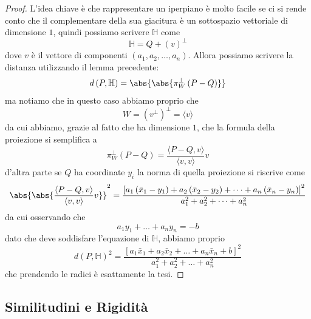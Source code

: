 \documentclass[11pt]{scrartcl}
\begin{document}
   	 \begin{proof}
   	 	L'idea chiave è che rappresentare un iperpiano è molto facile se ci si rende conto che il complementare della sua giacitura è un sottospazio vettoriale di dimensione $1$, quindi possiamo scrivere $\mathbb{H}$ come
   	 	$$\mathbb{H}=Q+\left(v\right)^\perp$$
   	 	dove $v$ è il vettore di componenti $(a_1,a_2,\dots,a_n)$. Allora possiamo scrivere la distanza utilizzando il lemma precedente:
   	 	$$d\left(P,\mathbb{H}\right)=\abs{\abs{\pi_W^\perp\left(P-Q\right)}}$$
   	 	ma notiamo che in questo caso abbiamo proprio che $$W=\left(v^\perp\right)^\perp=\langle v \rangle$$
   	 	da cui abbiamo, grazie al fatto che ha dimensione $1$, che la formula della proiezione si semplifica a 
   	 	$$\pi_W^\perp\left(P-Q\right)=\frac{\langle P-Q,v\rangle}{\langle v,v\rangle}v$$
   	 	d'altra parte se $Q$ ha coordinate $y_i$ la norma di quella proiezione si riscrive come
   	 	$$\abs{\abs{\frac{\langle P-Q,v\rangle}{\langle v,v\rangle}v}}^2=\frac{\left[a_1\left(\bar{x}_1-y_1\right)+a_2\left(\bar{x}_2-y_2\right)+\dots+a_n\left(\bar{x}_n-y_n\right)\right]^2}{a^2_1+a_2^2+\dots+a_n^2}$$
   	 	da cui osservando che
   	 	$$a_1y_1+\dots+a_ny_n=-b$$
   	 	dato che deve soddisfare l'equazione di $\mathbb{H}$, abbiamo proprio 
   	 	$$d(P,\mathbb{H})^2=\frac{\left[a_1\bar{x}_1+a_2\bar{x}_2+\dots+a_n\bar{x}_n+b\right]^2}{a^2_1+a_2^2+\dots+a_n^2}$$
   	 	che prendendo le radici è esattamente la tesi.
   	 \end{proof}
   	 
   	 \subsection{Similitudini e Rigidità}
   	 
\end{document}
